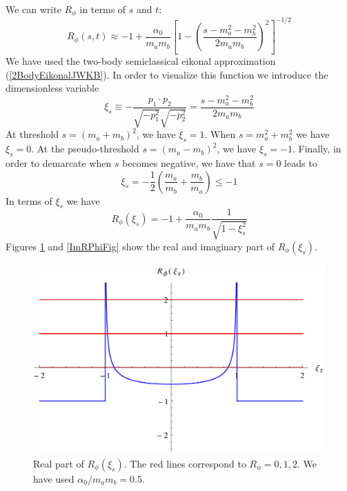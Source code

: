 We can write $R_{\phi}$ in terms of $s$ and $t$:
\begin{equation}
	R_{\phi}(s, t) \approx -1 + \frac{\alpha_{0}}{m_{a} m_{b}} \left[ 1 - \left( \frac{s - m_{a}^{2} - m_{b}^{2}}{2 m_{a} m_{b}} \right)^{2} \right]^{-1/2}
\end{equation}
We have used the two-body semiclassical eikonal approximation (\ref{2BodyEikonalJWKB}). In order to visualize this function we introduce the dimensionless variable
\begin{equation}
	\xi_{s} \equiv - \frac{p_{1} \cdot p_{2}}{\sqrt{-p_{1}^{2}} \sqrt{-p_{2}^{2}}} = \frac{s - m_{a}^{2} - m_{b}^{2}}{2 m_{a} m_{b}} \label{xis}
\end{equation}
At threshold $s = (m_{a} + m_{b})^{2}$, we have $\xi_{s} = 1$. When $s = m_{a}^{2} + m_{b}^{2}$ we have $\xi_{s} = 0$. At the pseudo-threshold $s = (m_{a} - m_{b})^{2}$, we have $\xi_{s} = -1$. Finally, in order to demarcate when $s$ becomes negative, we have that $s = 0$ leads to
\begin{equation}
	\xi_{s} = - \frac{1}{2} \left( \frac{m_{a}}{m_{b}} + \frac{m_{b}}{m_{a}} \right) \leq -1
\end{equation}
In terms of $\xi_{s}$ we have
\begin{equation}
	R_{\phi}(\xi_{s}) = -1 + \frac{\alpha_{0}}{m_{a} m_{b}} \frac{1}{\sqrt{1 - \xi^{2}_{s}}}
\end{equation}
Figures \ref{ReRPhiFig} and \ref{ImRPhiFig} show the real and imaginary part of $R_{\phi}(\xi_{s})$.

\begin{figure}
\centering
\includegraphics[scale=0.6]{Plots/ReRPhi.pdf}
\caption[Real part of the Regge trajectory function for the massless scalar exchange model]{Real part of $R_{\phi}(\xi_{s})$. The red lines correspond to $R_{\phi} = 0, 1, 2$. We have used $\alpha_{0} / m_{a} m_{b} = 0.5$.}
\label{ReRPhiFig}
\end{figure}

